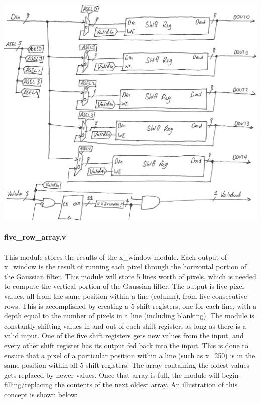 \documentclass[12pt]{article}
\begin{document}
\includegraphics[width=\textwidth]{processed_image_pngs/array.png}

\paragraph{five\_row\_array.v}
This module stores the results of the x\_window module. Each output of x\_window 
is the result of running each pixel through the horizontal portion of the 
Gaussian filter. This module will store 5 lines worth of pixels, which is needed 
to compute the vertical portion of the Gaussian filter. The output is five pixel 
values, all from the same position within a line (column), from five consecutive 
rows. This is accomplished by creating a 5 shift registers, one for each line, 
with a depth equal to the number of pixels in a line (including blanking).
The module is constantly shifting values in and out of each shift register, as 
long as there is a valid input. One of the five shift registers gets new values 
from the input, and every other shift register has its output fed back into the 
input. This is done to ensure that a pixel of a particular position within 
a line (such as x=250) is in the same position within all 5 shift registers. The 
array containing the oldest values gets replaced by newer values. Once that 
array is full, the module will begin filling/replacing the contents of the next 
oldest array. An illustration of this concept is shown below: 
\end{document}
